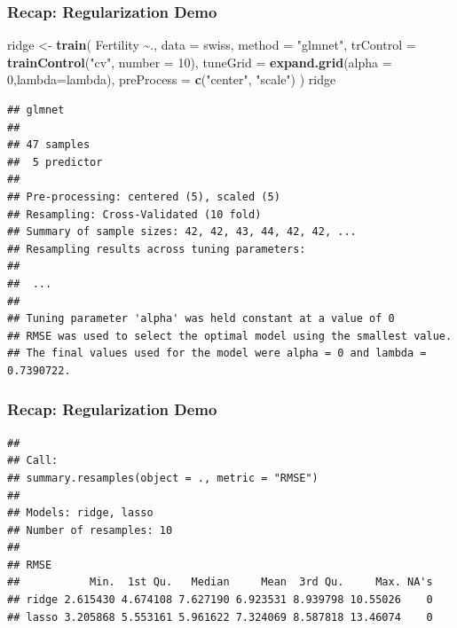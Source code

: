 \documentclass[
  shownotes,
  xcolor={svgnames},
  hyperref={colorlinks,citecolor=DarkBlue,linkcolor=DarkRed,urlcolor=DarkBlue}
  , aspectratio=169]{beamer}
\newenvironment{Shaded}{\begin{snugshade}}{\end{snugshade}}
\newcommand{\DataTypeTok}[1]{\textcolor[rgb]{0.13,0.29,0.53}{#1}}
\newcommand{\DecValTok}[1]{\textcolor[rgb]{0.00,0.00,0.81}{#1}}
\newcommand{\KeywordTok}[1]{\textcolor[rgb]{0.13,0.29,0.53}{\textbf{#1}}}
\newcommand{\NormalTok}[1]{#1}
\newcommand{\OperatorTok}[1]{\textcolor[rgb]{0.81,0.36,0.00}{\textbf{#1}}}
\newcommand{\StringTok}[1]{\textcolor[rgb]{0.31,0.60,0.02}{#1}}
\begin{document}
\begin{frame}[fragile]
\frametitle{Recap: Regularization Demo}

\begin{scriptsize}


\begin{Shaded}
\begin{Highlighting}[]
\NormalTok{ridge \textless{}{-}}\StringTok{ }\KeywordTok{train}\NormalTok{(}
\NormalTok{  Fertility }\OperatorTok{\textasciitilde{}}\NormalTok{., }\DataTypeTok{data =}\NormalTok{ swiss, }\DataTypeTok{method =} \StringTok{"glmnet"}\NormalTok{,}
  \DataTypeTok{trControl =} \KeywordTok{trainControl}\NormalTok{(}\StringTok{"cv"}\NormalTok{, }\DataTypeTok{number =} \DecValTok{10}\NormalTok{),}
  \DataTypeTok{tuneGrid =} \KeywordTok{expand.grid}\NormalTok{(}\DataTypeTok{alpha =} \DecValTok{0}\NormalTok{,}\DataTypeTok{lambda=}\NormalTok{lambda), }\DataTypeTok{preProcess =} \KeywordTok{c}\NormalTok{(}\StringTok{"center"}\NormalTok{, }\StringTok{"scale"}\NormalTok{)}
\NormalTok{  )}
\NormalTok{ridge}
\end{Highlighting}
\end{Shaded}
\end{scriptsize}
\begin{tiny}
\begin{verbatim}
## glmnet 
## 
## 47 samples
##  5 predictor
## 
## Pre-processing: centered (5), scaled (5) 
## Resampling: Cross-Validated (10 fold) 
## Summary of sample sizes: 42, 42, 43, 44, 42, 42, ... 
## Resampling results across tuning parameters:
## 
##  ...
## 
## Tuning parameter 'alpha' was held constant at a value of 0
## RMSE was used to select the optimal model using the smallest value.
## The final values used for the model were alpha = 0 and lambda = 0.7390722.
\end{verbatim}
\end{tiny}
\end{frame}
\begin{frame}[fragile]
\frametitle{Recap: Regularization Demo}




\begin{verbatim}
## 
## Call:
## summary.resamples(object = ., metric = "RMSE")
## 
## Models: ridge, lasso 
## Number of resamples: 10 
## 
## RMSE 
##           Min.  1st Qu.   Median     Mean  3rd Qu.     Max. NA's
## ridge 2.615430 4.674108 7.627190 6.923531 8.939798 10.55026    0
## lasso 3.205868 5.553161 5.961622 7.324069 8.587818 13.46074    0
\end{verbatim}

\end{frame}
\end{document}
